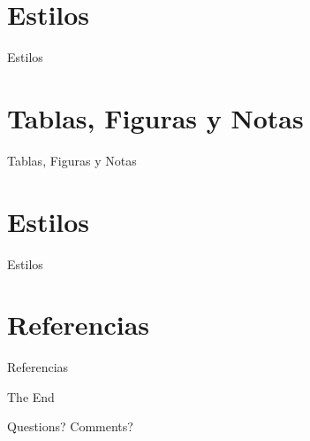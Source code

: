 \documentclass[
11pt, %
]{beamer}
\begin{document}
\section{Estilos}
\begin{frame}{Estilos}

\end{frame}


\section{Tablas, Figuras y Notas}
\begin{frame}{Tablas, Figuras y Notas}

\end{frame}

\section{Estilos}
\begin{frame}{Estilos}

\end{frame}

\section{Referencias}
\begin{frame}{Referencias}

\end{frame}


\begin{frame}[plain] %
	\begin{center}
		{\Huge The End}

		\bigskip\bigskip %

		{\LARGE Questions? Comments?}
	\end{center}
\end{frame}

\end{document}

